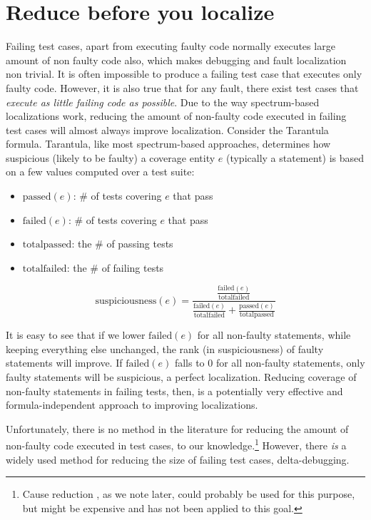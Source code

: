 \section{Reduce before you localize}


Failing test cases, apart from executing faulty code normally executes large amount of non faulty code also, which makes debugging and fault localization non trivial.  It is
often impossible to produce a failing test case that
executes only faulty code.  However, it is also true that for any
fault, there exist test cases that \emph{execute as little failing
code as possible}.  Due to the way spectrum-based localizations work,
reducing the amount of non-faulty code executed in failing test cases
will almost always improve localization.  Consider the Tarantula
\cite{Jones2002,Tarantula} formula.  Tarantula, like most spectrum-based
approaches, determines how suspicious (likely to be faulty) a coverage
entity $e$ (typically a statement) is based on a few values computed over
a test suite:

\begin{itemize}
\item $\text{passed}(e)$:  \# of tests covering $e$ that pass
\item $\text{failed}(e)$:  \# of tests covering $e$ that pass
\item $\text{totalpassed}$:  the \# of passing tests
\item $\text{totalfailed}$:  the \# of failing tests
\end{itemize}

$$ \text{suspiciousness}(e) =  \frac{\frac{\text{failed}(e)}{\text{totalfailed}}}{\frac{\text{failed}(e)}{\text{totalfailed}} + \frac{\text{passed}(e)}{\text{totalpassed}}}$$


It is easy to see that if we lower $\text{failed}(e)$ for all
non-faulty statements, while keeping everything else unchanged, the
rank (in suspiciousness) of faulty statements will improve.  If
$\text{failed}(e)$ falls to 0 for all non-faulty statements, only
faulty statements will be suspicious, a perfect localization.  Reducing coverage of non-faulty
statements in failing tests, then, is a potentially very effective  and
formula-independent approach to improving localizations.

Unfortunately, there is no method in the literature for reducing the
amount of non-faulty code executed in test cases, to our
knowledge.\footnote{Cause reduction \cite{icst2014}, as we note later,
could probably be used for this purpose, but might be expensive and
has not been applied to this goal.}  However, there \emph{is} a widely
used method for reducing the size of failing test cases, delta-debugging.

